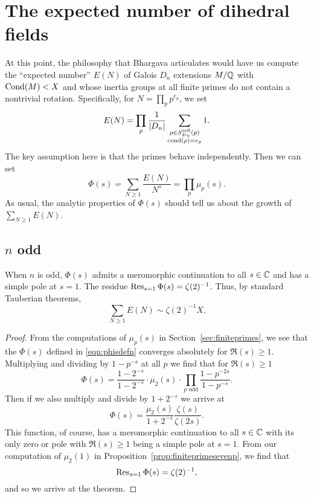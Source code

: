\section{The expected number of dihedral fields}\label{sec:dirichletseries}

At this point, the philosophy that Bhargava articulates \cite{bhargavamass}
would have us compute the ``expected number'' $E(N)$ of Galois $D_n$ extensions
$M/\mathbb{Q}$ with $\operatorname{Cond}(M) < X$ and whose inertia groups at all finite primes do not
contain a nontrivial rotation. Specifically, for $N = \prod_p p^{e_p}$, we set
\begin{equation}\label{eqn:endefn}
E(N) = \prod_p \frac{1}{|D_n|} \sum_{\substack{\rho \in S_{D_n}^{\mathrm{refl}}(p) \\ \operatorname{cond}(\rho) = e_p}} 1.
\end{equation}
The key assumption here is that the primes behave independently. Then we can set
\begin{equation}\label{eqn:phisdefn}
  \Phi(s) = \sum_{N \geq 1} \frac{E(N)}{N^s} = \prod_p \mu_p(s).
\end{equation}
As usual, the analytic properties of $\Phi(s)$ should tell us about the growth
of $\sum_{N \geq 1} E(N)$.

\subsection{$n$ odd}

\begin{thm}\label{thm:phiodd}
  When $n$ is odd, $\Phi(s)$ admits a meromorphic continuation to all $s \in
\mathbb{C}$ and has a simple pole at $s = 1$. The residue $\operatorname{Res}_{s=1}\Phi(s) =
\zeta(2)^{-1}$. Thus, by standard Tauberian theorems,
\[ \sum_{N \geq 1} E(N) \sim \zeta(2)^{-1} X. \]
\end{thm}
\begin{proof}

  From the computations of $\mu_p(s)$ in Section~\ref{sec:finiteprimes}, we see
that the $\Phi(s)$ defined in \eqref{eqn:phisdefn} converges absolutely for
$\Re(s) \geq 1$. Multiplying and dividing by $1 - p^{-s}$ at all $p$ we find
that for $\Re(s) \geq 1$
\[ \Phi(s) = \frac{1 - 2^{-s}}{1 - 2^{-s}} \cdot \mu_2(s) \cdot \prod_{p\text{ odd}} \frac{1 - p^{-2s}}{1 - p^{-s}}. \]
Then if we also multiply and divide by $1 + 2^{-s}$ we arrive at
\[ \Phi(s) = \frac{\mu_2(s)}{1 + 2^{-s}} \frac{\zeta(s)}{\zeta(2s)}. \]
This function, of course, has a meromorphic continuation to all $s \in \mathbb{C}$ with
its only zero or pole with $\Re(s) \geq 1$ being a simple pole at $s = 1$. From our computation of $\mu_2(1)$ in
Proposition~\ref{prop:finiteprimesevenp}, we find that
\[ \operatorname{Res}_{s = 1}\Phi(s) = \zeta(2)^{-1}, \]
and so we arrive at the theorem.
\end{proof}

